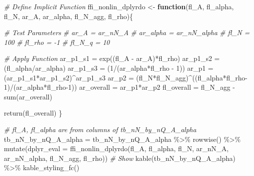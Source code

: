 \documentclass[
]{book}
\newenvironment{Shaded}{\begin{snugshade}}{\end{snugshade}}
\newcommand{\AttributeTok}[1]{\textcolor[rgb]{0.77,0.63,0.00}{#1}}
\newcommand{\CommentTok}[1]{\textcolor[rgb]{0.56,0.35,0.01}{\textit{#1}}}
\newcommand{\ControlFlowTok}[1]{\textcolor[rgb]{0.13,0.29,0.53}{\textbf{#1}}}
\newcommand{\DecValTok}[1]{\textcolor[rgb]{0.00,0.00,0.81}{#1}}
\newcommand{\FunctionTok}[1]{\textcolor[rgb]{0.00,0.00,0.00}{#1}}
\newcommand{\NormalTok}[1]{#1}
\newcommand{\OtherTok}[1]{\textcolor[rgb]{0.56,0.35,0.01}{#1}}
\newcommand{\SpecialCharTok}[1]{\textcolor[rgb]{0.00,0.00,0.00}{#1}}
\begin{document}
\begin{Shaded}
\begin{Highlighting}[]
\CommentTok{\# Define Implicit Function}
\NormalTok{ffi\_nonlin\_dplyrdo }\OtherTok{\textless{}{-}} \ControlFlowTok{function}\NormalTok{(fl\_A, fl\_alpha, fl\_N, ar\_A, ar\_alpha, fl\_N\_agg, fl\_rho)\{}

  \CommentTok{\# Test Parameters}
  \CommentTok{\# ar\_A = ar\_nN\_A}
  \CommentTok{\# ar\_alpha = ar\_nN\_alpha}
  \CommentTok{\# fl\_N = 100}
  \CommentTok{\# fl\_rho = {-}1}
  \CommentTok{\# fl\_N\_q = 10}

  \CommentTok{\# Apply Function}
\NormalTok{  ar\_p1\_s1 }\OtherTok{=} \FunctionTok{exp}\NormalTok{((fl\_A }\SpecialCharTok{{-}}\NormalTok{ ar\_A)}\SpecialCharTok{*}\NormalTok{fl\_rho)}
\NormalTok{  ar\_p1\_s2 }\OtherTok{=}\NormalTok{ (fl\_alpha}\SpecialCharTok{/}\NormalTok{ar\_alpha)}
\NormalTok{  ar\_p1\_s3 }\OtherTok{=}\NormalTok{ (}\DecValTok{1}\SpecialCharTok{/}\NormalTok{(ar\_alpha}\SpecialCharTok{*}\NormalTok{fl\_rho }\SpecialCharTok{{-}} \DecValTok{1}\NormalTok{))}
\NormalTok{  ar\_p1 }\OtherTok{=}\NormalTok{ (ar\_p1\_s1}\SpecialCharTok{*}\NormalTok{ar\_p1\_s2)}\SpecialCharTok{\^{}}\NormalTok{ar\_p1\_s3}
\NormalTok{  ar\_p2 }\OtherTok{=}\NormalTok{ (fl\_N}\SpecialCharTok{*}\NormalTok{fl\_N\_agg)}\SpecialCharTok{\^{}}\NormalTok{((fl\_alpha}\SpecialCharTok{*}\NormalTok{fl\_rho}\DecValTok{{-}1}\NormalTok{)}\SpecialCharTok{/}\NormalTok{(ar\_alpha}\SpecialCharTok{*}\NormalTok{fl\_rho}\DecValTok{{-}1}\NormalTok{))}
\NormalTok{  ar\_overall }\OtherTok{=}\NormalTok{ ar\_p1}\SpecialCharTok{*}\NormalTok{ar\_p2}
\NormalTok{  fl\_overall }\OtherTok{=}\NormalTok{ fl\_N\_agg }\SpecialCharTok{{-}} \FunctionTok{sum}\NormalTok{(ar\_overall)}

  \FunctionTok{return}\NormalTok{(fl\_overall)}
\NormalTok{\}}

\CommentTok{\# fl\_A, fl\_alpha are from columns of tb\_nN\_by\_nQ\_A\_alpha}
\NormalTok{tb\_nN\_by\_nQ\_A\_alpha }\OtherTok{=}\NormalTok{ tb\_nN\_by\_nQ\_A\_alpha }\SpecialCharTok{\%\textgreater{}\%} \FunctionTok{rowwise}\NormalTok{() }\SpecialCharTok{\%\textgreater{}\%}
                        \FunctionTok{mutate}\NormalTok{(}\AttributeTok{dplyr\_eval =} \FunctionTok{ffi\_nonlin\_dplyrdo}\NormalTok{(fl\_A, fl\_alpha, fl\_N,}
\NormalTok{                                                               ar\_nN\_A, ar\_nN\_alpha,}
\NormalTok{                                                               fl\_N\_agg, fl\_rho))}
\CommentTok{\# Show}
\FunctionTok{kable}\NormalTok{(tb\_nN\_by\_nQ\_A\_alpha) }\SpecialCharTok{\%\textgreater{}\%}
  \FunctionTok{kable\_styling\_fc}\NormalTok{()}
\end{Highlighting}
\end{Shaded}
\end{document}
